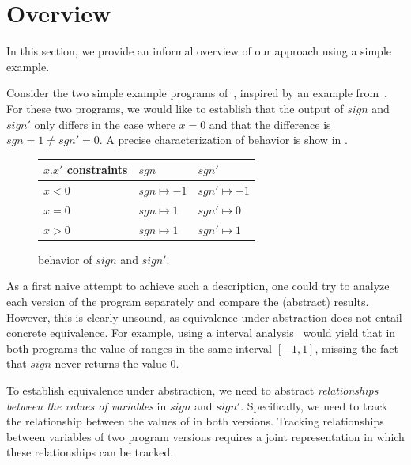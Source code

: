 \section{Overview}

In this section, we provide an informal overview of our approach using a simple example.



Consider the two simple example programs of~, inspired by an example from~\cite{MauborgneRival07}. For these two programs, we would like to establish that the output of $sign$ and $sign'$ only differs in the case where $x=0$ and that the difference is $sgn = 1 \neq sgn' = 0$. A precise characterization of behavior is show in .

\begin{figure}
\footnotesize
\centering
\begin{tabular}{l|l|l}
$x.x'$ constraints  & $sgn$             & $sgn'$
\\ \hline
$x < 0$             & $sgn \mapsto -1$  & $sgn' \mapsto -1$
\\ \hline
$x = 0$             & $sgn \mapsto 1$  & $sgn' \mapsto 0$
\\ \hline
$x > 0$             & $sgn \mapsto 1$  & $sgn' \mapsto 1$
\end{tabular}
\caption{behavior of $sign$ and $sign'$.}\label{Fi:SignSummary}
\end{figure}

As a first naive attempt to achieve such a description, one could try to analyze each version of the program separately and compare the (abstract) results. However, this is clearly unsound, as equivalence under abstraction does not entail concrete equivalence. For example, using a interval analysis~\cite{CousotHalbwachs78} would yield that in both programs the value of  ranges in the same interval $[-1,1]$, missing the fact that $sign$ never returns the value $0$.


To establish equivalence under abstraction, we need to abstract \emph{relationships between the values of variables} in $sign$ and $sign'$. Specifically, we need to track the relationship between the values of  in both versions. Tracking relationships between variables of two program versions requires a joint representation in which these relationships can be tracked.

